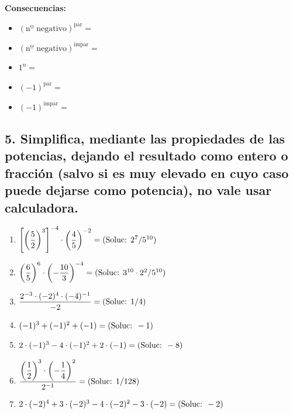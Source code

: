 \documentclass[a4paper,12pt]{article}
\begin{document}
\textbf{Consecuencias:}
\begin{itemize}
    \item $(\text{nº negativo})^{\text{par}} =$
    \item $(\text{nº negativo})^{\text{impar}} =$
    \item $1^{n} =$
    \item $(-1)^{\text{par}} =$
    \item $(-1)^{\text{impar}} =$
\end{itemize}

\vspace{0.5cm}

\subsection*{5. Simplifica, mediante las propiedades de las potencias, dejando el resultado como entero o fracción (salvo si es muy elevado en cuyo caso puede dejarse como potencia), no vale usar calculadora.}

\begin{enumerate}[label=\alph*)]
    \item $\left[\left(\dfrac{5}{2}\right)^{3}\right]^{-4} \cdot \left(\dfrac{4}{5}\right)^{-2} = \hfill \text{(Soluc: } 2^{7}/5^{10}\text{)}$
    \vspace{0.2cm}
    \item $\left(\dfrac{6}{5}\right)^{6} \cdot \left(-\dfrac{10}{3}\right)^{-4} = \hfill \text{(Soluc: } 3^{10} \cdot 2^{2} / 5^{10}\text{)}$
    \vspace{0.2cm}
    \item $\dfrac{2^{-3} \cdot (-2)^{4} \cdot (-4)^{-1}}{-2} = \hfill \text{(Soluc: } 1/4\text{)}$
    \vspace{0.2cm}
    \item $(-1)^{3} + (-1)^{2} + (-1) = \hfill \text{(Soluc: } -1\text{)}$
    \vspace{0.2cm}
    \item $2 \cdot (-1)^{3} - 4 \cdot (-1)^{2} + 2 \cdot (-1) = \hfill \text{(Soluc: } -8\text{)}$
    \vspace{0.2cm}
    \item $\dfrac{\left(\dfrac{1}{2}\right)^{3} \cdot \left(-\dfrac{1}{4}\right)^{2}}{2^{-1}} = \hfill \text{(Soluc: } 1/128\text{)}$
    \vspace{0.2cm}
    \item $2 \cdot (-2)^{4} + 3 \cdot (-2)^{3} - 4 \cdot (-2)^{2} - 3 \cdot (-2) = \hfill \text{(Soluc: } -2\text{)}$
\end{enumerate}
\end{document}
